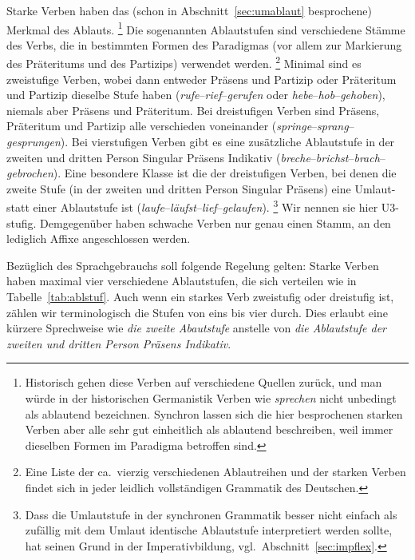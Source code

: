 Starke Verben haben das (schon in Abschnitt~\ref{sec:umablaut} besprochene) Merkmal des Ablauts.%
\footnote{Historisch gehen diese Verben auf verschiedene Quellen zurück, und man würde in der historischen Germanistik Verben wie \textit{sprechen} nicht unbedingt als ablautend bezeichnen.
Synchron lassen sich die hier besprochenen starken Verben aber alle sehr gut einheitlich als ablautend beschreiben, weil immer dieselben Formen im Paradigma betroffen sind.}
Die sogenannten Ablautstufen sind verschiedene Stämme des Verbs, die in bestimmten Formen des Paradigmas (vor allem zur Markierung des Präteritums und des Partizips) verwendet werden.%
\footnote{Eine Liste der ca.\ vierzig verschiedenen Ablautreihen und der starken Verben findet sich in jeder leidlich vollständigen Grammatik des Deutschen.}
Minimal sind es zweistufige Verben, wobei dann entweder Präsens und Partizip oder Präteritum und Partizip dieselbe Stufe haben (\textit{rufe}--\textit{rief}--\textit{gerufen} oder \textit{hebe}--\textit{hob}--\textit{gehoben}), niemals aber Präsens und Präteritum.
Bei dreistufigen Verben sind Präsens, Präteritum und Partizip alle verschieden voneinander (\textit{springe}--\textit{sprang}--\textit{gesprungen}).
Bei vierstufigen Verben gibt es eine zusätzliche Ablautstufe in der zweiten und dritten Person Singular Präsens Indikativ (\textit{breche}--\textit{brichst}--\textit{brach}--\textit{gebrochen}).
Eine besondere Klasse ist die der dreistufigen Verben, bei denen die zweite Stufe (in der zweiten und dritten Person Singular Präsens) eine Umlaut- statt einer Ablautstufe ist (\textit{laufe}--\textit{läufst}--\textit{lief}--\textit{gelaufen}).%
\footnote{Dass die Umlautstufe in der synchronen Grammatik besser nicht einfach als zufällig mit dem Umlaut identische Ablautstufe interpretiert werden sollte, hat seinen Grund in der Imperativbildung, vgl.\ Abschnitt~\ref{sec:impflex}.}
Wir nennen sie hier U3-stufig.
Demgegenüber haben schwache Verben nur genau einen Stamm, an den lediglich Affixe angeschlossen werden.



Bezüglich des Sprachgebrauchs soll folgende Regelung gelten:
Starke Verben haben maximal vier verschiedene Ablautstufen, die sich verteilen wie in Tabelle~\ref{tab:ablstuf}.
Auch wenn ein starkes Verb zweistufig oder dreistufig ist, zählen wir terminologisch die Stufen von eins bis vier durch.
Dies erlaubt eine kürzere Sprechweise wie \textit{die zweite Abautstufe} anstelle von \textit{die Ablautstufe der zweiten und dritten Person Präsens Indikativ}.

